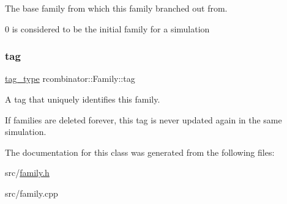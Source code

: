 The base family from which this family branched out from. 

0 is considered to be the initial family for a simulation \mbox{\label{classrcombinator_1_1Family_a9a23685e7a5058874a06c171c80f9c63}} 
\subsubsection{\texorpdfstring{tag}{tag}}
{\footnotesize\ttfamily \mbox{\hyperlink{constants_8h_a3e6daf1646e952257330d8cfe20e96f8}{tag\+\_\+type}} rcombinator\+::\+Family\+::tag\hspace{0.3cm}{\ttfamily [private]}}



A tag that uniquely identifies this family. 

If families are deleted forever, this tag is never updated again in the same simulation. 

The documentation for this class was generated from the following files\+:\begin{DoxyCompactItemize}
\item 
src/\mbox{\hyperlink{family_8h}{family.\+h}}\item 
src/family.\+cpp\end{DoxyCompactItemize}
